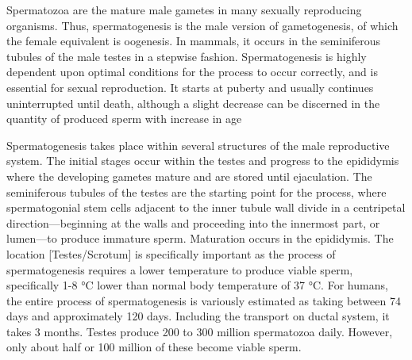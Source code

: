 Spermatozoa are the mature male gametes in many sexually reproducing
organisms. Thus, spermatogenesis is the male version of gametogenesis,
of which the female equivalent is oogenesis. In mammals, it occurs in
the seminiferous tubules of the male testes in a stepwise fashion.
Spermatogenesis is highly dependent upon optimal conditions for the
process to occur correctly, and is essential for sexual reproduction. It
starts at puberty and usually continues uninterrupted until death,
although a slight decrease can be discerned in the quantity of produced
sperm with increase in age

Spermatogenesis takes place within several structures of the male
reproductive system. The initial stages occur within the testes and
progress to the epididymis where the developing gametes mature and are
stored until ejaculation. The seminiferous tubules of the testes are the
starting point for the process, where spermatogonial stem cells adjacent
to the inner tubule wall divide in a centripetal direction---beginning
at the walls and proceeding into the innermost part, or lumen---to
produce immature sperm. Maturation occurs in the epididymis. The
location {[}Testes/Scrotum{]} is specifically important as the process
of spermatogenesis requires a lower temperature to produce viable sperm,
specifically 1-8 °C lower than normal body temperature of 37 °C. For
humans, the entire process of spermatogenesis is variously estimated as
taking between 74 days and approximately 120 days. Including the
transport on ductal system, it takes 3 months. Testes produce 200 to 300
million spermatozoa daily. However, only about half or 100 million of
these become viable sperm.

